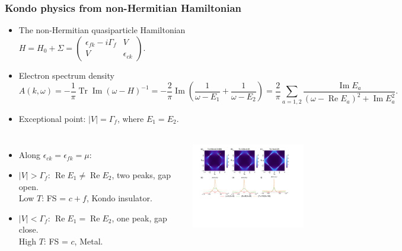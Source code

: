 \documentclass[xcolor=table, 10pt, aspectratio=169]{beamer}
\DeclareMathOperator{\tr}{Tr}
\DeclareMathOperator{\im}{Im}
\DeclareMathOperator{\re}{Re}
\begin{document}
\begin{frame}
\frametitle{Kondo physics from non-Hermitian Hamiltonian}
\begin{itemize}
\item The non-Hermitian quasiparticle Hamiltonian $H = H_0+\Sigma = \begin{pmatrix}
\epsilon_{fk} - i\Gamma_f & V\\ V & \epsilon_{ck}
\end{pmatrix}$.
\item Electron spectrum density
\[A(k, \omega)=-\frac1\pi\tr\im (\omega - H)^{-1}
=-\frac2\pi\im\left(
\frac1{\omega-E_1}+\frac1{\omega-E_2}\right)
=\frac2\pi\sum_{a=1,2}\frac{\im E_a}{(\omega-\re E_a)^2+\im E_a^2}.\]
\item Exceptional point: $|V|=\Gamma_f$, where $E_1=E_2$.
\end{itemize}

\begin{columns}
\begin{itemize}
\item Along $\epsilon_{ck}=\epsilon_{fk}=\mu$:
\item $|V|>\Gamma_f$: $\re E_1\neq\re E_2$, two peaks, gap open.\\
Low $T$: FS = $c+f$, Kondo insulator.
\item $|V|<\Gamma_f$: $\re E_1=\re E_2$, one peak, gap close.\\
High $T$: FS = $c$, Metal.
\end{itemize}
	\includegraphics[height=4cm]{arc2}
\end{columns}
\end{frame}
\end{document}
